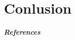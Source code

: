 \documentclass{beamer}\usepackage[]{graphicx}\usepackage[]{color}
\begin{document}
\part{Conlusion}

\begin{frame}[allowframebreaks]
  \frametitle{References}

 

\begin{small}
  }
\end{small}

\end{frame}
\end{document}
